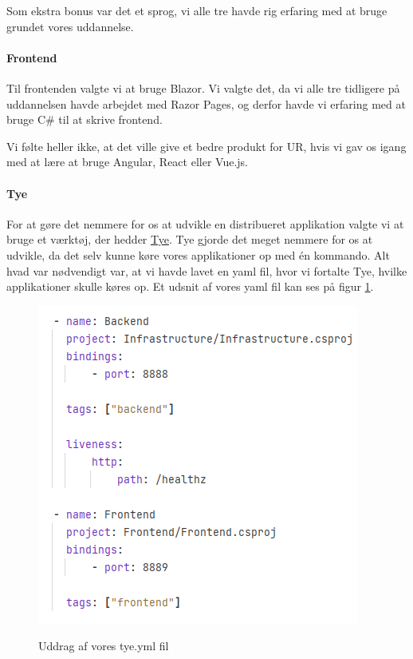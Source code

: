 \documentclass[a4paper]{article}
\begin{document}
Som ekstra bonus var det et sprog, 
vi alle tre havde rig erfaring med at bruge grundet vores uddannelse.

\paragraph{Frontend}
Til frontenden valgte vi at bruge Blazor.
Vi valgte det,
da vi alle tre tidligere på uddannelsen havde arbejdet med Razor Pages,
og derfor havde vi erfaring med at bruge C\# til at skrive frontend.

Vi følte heller ikke, at det ville give et bedre produkt for UR,
hvis vi gav os igang med at lære at bruge Angular, React eller Vue.js.

\paragraph{Tye}
For at gøre det nemmere for os at udvikle en distribueret applikation
valgte vi at bruge et værktøj, der hedder
\href{https://github.com/dotnet/tye}{Tye}.
Tye gjorde det meget nemmere for os at udvikle,
da det selv kunne køre vores applikationer op med én kommando.
Alt hvad var nødvendigt var,
at vi havde lavet en yaml fil,
hvor vi fortalte Tye,
hvilke applikationer skulle køres op.
Et udsnit af vores yaml fil kan ses på figur \ref{tye}.

\begin{figure}[ht!]
    \includegraphics[scale=0.7]{tye.png}
    \centering
    \label{tye}
    \caption{Uddrag af vores tye.yml fil}
\end{figure}
\end{document}

